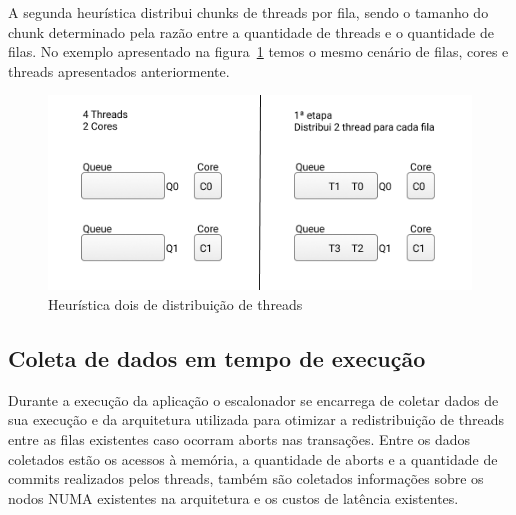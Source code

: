 \documentclass[diss,capa]{texufpel}
\begin{document}

A segunda heurística distribui chunks de threads por fila, sendo o tamanho do chunk determinado pela razão entre a quantidade de threads e o quantidade de filas. No exemplo apresentado na figura~\ref{queue_two} temos o mesmo cenário de filas, cores e threads apresentados anteriormente.



\begin{figure}[htbp]
  \centering
  \includegraphics[scale=.8]{images/Queue_two.png}
\caption{Heurística dois de distribuição de threads}
\label{queue_two}
\end{figure}


\subsection{Coleta de dados em tempo de execução}
\label{coleta}

Durante a execução da aplicação o escalonador se encarrega de coletar dados de sua execução e da arquitetura utilizada para otimizar a redistribuição de threads entre as filas existentes caso ocorram aborts nas transações. Entre os dados coletados estão os acessos à memória, a quantidade de aborts e a quantidade de commits realizados pelos threads, também são coletados informações sobre os nodos NUMA existentes na arquitetura e os custos de latência existentes.
\end{document}
